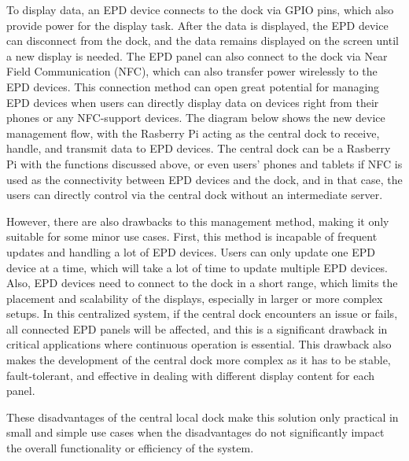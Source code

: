 \documentclass[../Main.tex]{subfiles}
\begin{document}
To display data, an \gls{EPD} device connects to the dock via GPIO pins, which also provide power for the display task. After the data is displayed, the \gls{EPD} device can disconnect from the dock, and the data remains displayed on the screen until a new display is needed. The \gls{EPD} panel can also connect to the dock via Near Field Communication (NFC), which can also transfer power wirelessly to the \gls{EPD} devices. This connection method can open great potential for managing \gls{EPD} devices when users can directly display data on devices right from their phones or any NFC-support devices. The diagram below shows the new device management flow, with the Rasberry Pi acting as the central dock to receive, handle, and transmit data to \gls{EPD} devices. The central dock can be a Rasberry Pi with the functions discussed above, or even users' phones and tablets if NFC is used as the connectivity between \gls{EPD} devices and the dock, and in that case, the users can directly control via the central dock without an intermediate server.

However, there are also drawbacks to this management method, making it only suitable for some minor use cases. First, this method is incapable of frequent updates and handling a lot of \gls{EPD} devices. Users can only update one \gls{EPD} device at a time, which will take a lot of time to update multiple \gls{EPD} devices. Also, \gls{EPD} devices need to connect to the dock in a short range, which limits the placement and scalability of the displays, especially in larger or more complex setups. In this centralized system, if the central dock encounters an issue or fails, all connected \gls{EPD} panels will be affected, and this is a significant drawback in critical applications where continuous operation is essential. This drawback also makes the development of the central dock more complex as it has to be stable, fault-tolerant, and effective in dealing with different display content for each panel.

These disadvantages of the central local dock make this solution only practical in small and simple use cases when the disadvantages do not significantly impact the overall functionality or efficiency of the system.
\end{document}
